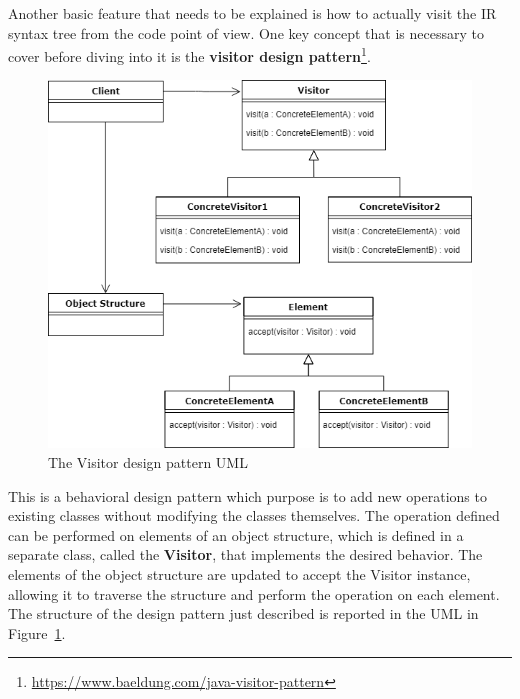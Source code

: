Another basic feature that needs to be explained is how to actually visit the IR syntax tree from the code point of view. One key concept that is necessary to cover before diving into it is the \textbf{visitor design pattern}\footnote{\url{https://www.baeldung.com/java-visitor-pattern}\label{visitor_pattern_footnote}}.
\begin{figure}[!ht]
    \centering
    \includegraphics[scale=0.55]{document/chapters/2-metaprogramming/images/visitor_pattern_uml.png}
    \caption{The Visitor design pattern UML}
    \label{fig:visitor_uml}
\end{figure}
This is a behavioral design pattern which purpose is to add new operations to existing classes without modifying the classes themselves.\newline
The operation defined can be performed on elements of an object structure, which is defined in a separate class, called the \textbf{Visitor}, that implements the desired behavior. The elements of the object structure are updated to accept the Visitor instance, allowing it to traverse the structure and perform the operation on each element. The structure of the design pattern just described is reported in the UML in Figure~\ref{fig:visitor_uml}.

